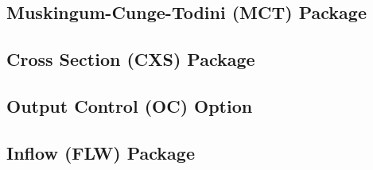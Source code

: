 \newpage
\subsection{Muskingum-Cunge-Todini (MCT) Package}


\newpage
\subsection{Cross Section (CXS) Package}


%

\newpage
\subsection{Output Control (OC) Option}


%

\newpage
\subsection{Inflow (FLW) Package}



